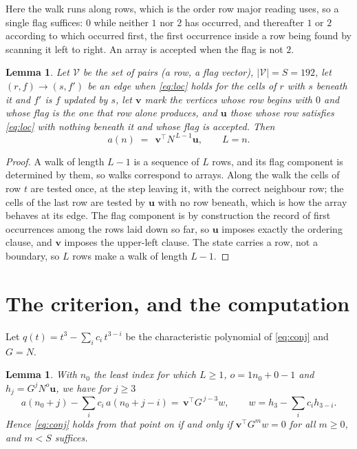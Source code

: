 \documentclass[11pt,a4paper]{article}
\theoremstyle{plain}
\newtheorem{lemma}[theorem]{Lemma}
\theoremstyle{definition}
\begin{document}
Here the walk runs along rows, which is the order row
major reading uses, so a single flag suffices: $0$ while neither $1$ nor $2$ has
occurred, and thereafter $1$ or $2$ according to which occurred first, the first occurrence
inside a row being found by scanning it left to right. An array is accepted when the flag
is not $2$.

\begin{lemma}\label{lem:walk}
Let $\mathcal V$ be the set of pairs (a row, a flag vector), $|\mathcal V|=S=192$, let
$(r,f)\to(s,f')$ be an edge when \eqref{eq:loc} holds for the cells of $r$ with $s$ beneath
it and $f'$ is $f$ updated by $s$, let $\mathbf{v}$ mark the vertices whose row begins
with $0$ and whose flag is the one that row alone produces, and $\mathbf{u}$ those whose
row satisfies \eqref{eq:loc} with nothing beneath it and whose flag is accepted. Then
\[
a(n)\;=\;\,\mathbf{v}^{\!\top}N^{\,L-1}\mathbf{u},\qquad L=n.
\]
\end{lemma}

\begin{proof}
A walk of length $L-1$ is a sequence of $L$ rows, and its flag component is determined by
them, so walks correspond to arrays. Along the walk the cells of row $t$ are tested once,
at the step leaving it, with the correct neighbour row; the cells of the last row are
tested by $\mathbf{u}$ with no row beneath, which is how the array behaves at its edge.
The flag component is by construction the record of first occurrences among the rows laid
down so far, so $\mathbf{u}$ imposes exactly the ordering clause, and $\mathbf{v}$ imposes
the upper-left clause. The state carries a row, not a boundary, so $L$ rows make a walk
of length $L-1$.
\end{proof}

\section{The criterion, and the computation}

Let $q(t)=t^{3}-\sum_i c_i\,t^{3-i}$ be the characteristic polynomial of
\eqref{eq:conj} and $G=N$.

\begin{lemma}\label{lem:crit}
With $n_0$ the least index for which $L\ge1$, $o=1n_0+0-1$ and
$h_j=G^{j}N^{o}\mathbf{u}$, we have for $j\ge3$
\[
a(n_0+j)-\sum_i c_i\,a(n_0+j-i)=\,\mathbf{v}^{\!\top}G^{\,j-3}w,
\qquad w=h_{3}-\sum_i c_ih_{3-i} .
\]
Hence \eqref{eq:conj} holds from that point on if and only if
$\mathbf{v}^{\!\top}G^{m}w=0$ for all $m\ge0$, and $m<S$ suffices.
\end{lemma}
\end{document}

